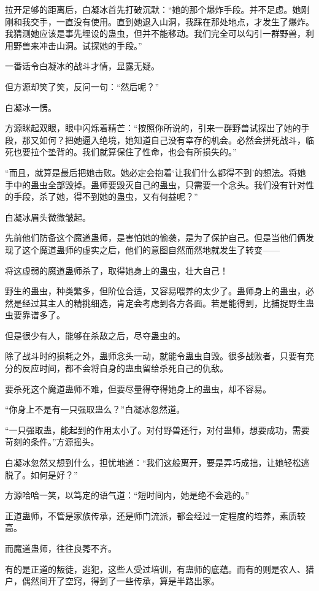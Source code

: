 \begin{this_body}
拉开足够的距离后，白凝冰首先打破沉默：“她的那个爆炸手段。并不足虑。她刚刚和我交手，一直没有使用。直到她退入山洞，我踩在那处地点，才发生了爆炸。我猜测她应该是事先埋设的蛊虫，但并不能移动。我们完全可以勾引一群野兽，利用野兽来冲击山洞。试探她的手段。”

一番话令白凝冰的战斗才情，显露无疑。

但方源却笑了笑，反问一句：“然后呢？”

白凝冰一愣。

方源眯起双眼，眼中闪烁着精芒：“按照你所说的，引来一群野兽试探出了她的手段，那又如何？把她逼入绝境，她知道自己没有幸存的机会。必然会拼死战斗，临死也要拉个垫背的。我们就算保住了性命，也会有所损失的。”

“而且，就算是最后把她击败。她必定会抱着‘让我们什么都得不到’的想法。将她手中的蛊虫全部毁掉。蛊师要毁灭自己的蛊虫，只需要一个念头。我们没有针对性的手段，杀了她，得不到她的蛊虫，又有何益呢？”

白凝冰眉头微微皱起。

先前他们防备这个魔道蛊师，是害怕她的偷袭，是为了保护自己。但是当他们俩发现了这个魔道蛊师的虚实之后，他们的意图自然而然地就发生了转变——

将这虚弱的魔道蛊师杀了，取得她身上的蛊虫，壮大自己！

野生的蛊虫，种类繁多，但阶位合适，又容易喂养的太少了。蛊师身上的蛊虫，必然是经过其主人的精挑细选，肯定会考虑到各方各面。若是能得到，比捕捉野生蛊虫要靠谱多了。

但是很少有人，能够在杀敌之后，尽夺蛊虫的。

除了战斗时的损耗之外，蛊师念头一动，就能令蛊虫自毁。很多战败者，只要有充分的反应时间，都不会将自身的蛊虫留给杀死自己的仇敌。

要杀死这个魔道蛊师不难，但要尽量得夺得她身上的蛊虫，却不容易。

“你身上不是有一只强取蛊么？”白凝冰忽然道。

“一只强取蛊，能起到的作用太小了。对付野兽还行，对付蛊师，想要成功，需要苛刻的条件。”方源摇头。

白凝冰忽然又想到什么，担忧地道：“我们这般离开，要是弄巧成拙，让她轻松逃脱了。如何是好？”

方源哈哈一笑，以笃定的语气道：“短时间内，她是绝不会逃的。”

正道蛊师，不管是家族传承，还是师门流派，都会经过一定程度的培养，素质较高。

而魔道蛊师，往往良莠不齐。

有的是正道的叛徒，逃犯，这些人受过培训，有蛊师的底蕴。而有的则是农人、猎户，偶然间开了空窍，得到了一些传承，算是半路出家。


\end{this_body}
